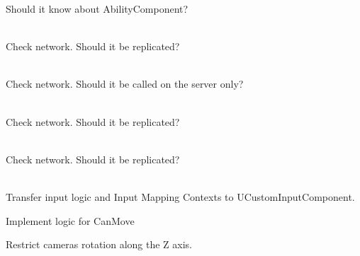 \begin{DoxyRefList}
\label{todo__todo000007}%
%
Should it know about Ability\+Component?  
\item[Member \doxylink{class_u_base_ability_a963445559c787f3b58954d5e7e4e478c}{UBase\+Ability\+::Ability\+Tag} ]\hfill \\
\label{todo__todo000009}%
%
Check network. Should it be replicated?  
\item[Member \doxylink{class_u_base_ability_ac3458eefc2b7a0fca50475cc7fe33d9f}{UBase\+Ability\+::Init\+Ability} (\doxylink{class_u_ability_component}{UAbility\+Component} \texorpdfstring{$\ast$}{*}\+Owner)]\hfill \\
\label{todo__todo000008}%
%
Check network. Should it be called on the server only?  
\item[Member \doxylink{class_u_base_ability_aa60aa19a9c33341bdcd0417a6c9ddb8d}{UBase\+Ability\+::Owner\+Ability\+Component} ]\hfill \\
\label{todo__todo000011}%
%
Check network. Should it be replicated?  
\item[Member \doxylink{class_u_base_ability_a79c27d61b2a2abba07113222bd00029a}{UBase\+Ability\+::Required\+Weapon\+Tags} ]\hfill \\
\label{todo__todo000010}%
%
Check network. Should it be replicated?  
\item[Class \doxylink{class_u_custom_locomotion_component}{UCustom\+Locomotion\+Component} ]\hfill \\
\label{todo__todo000005}%
%
Transfer input logic and Input Mapping Contexts to \textquotesingle{}UCustom\+Input\+Component\textquotesingle{}. 



Implement logic for Can\+Move 



Restrict camera\textquotesingle{}s rotation along the Z axis. 
\end{DoxyRefList}
